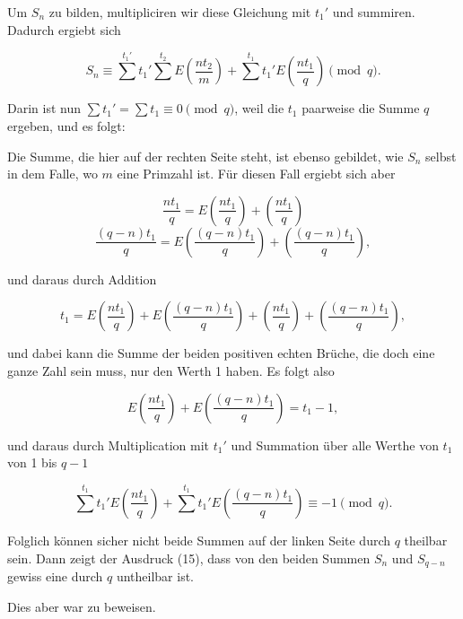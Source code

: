

Um $S_n$ zu bilden, multipliciren wir diese Gleichung mit $t_1'$ und
summiren. Dadurch ergiebt sich

\[
S_n \equiv \sum^{t_1'} t_1' \sum^{t_2} E\left(\frac{n t_2}{m}\right)
+ \sum^{t_1} t_1' E\left(\frac{n t_1}{q}\right) \pmod q.
\]

Darin ist nun $\sum t_1' = \sum t_1 \equiv 0 \pmod q$, weil die $t_1$
paarweise die Summe $q$ ergeben, und es folgt:


Die Summe, die hier auf der rechten Seite steht, ist ebenso gebildet,
wie $S_n$ selbst in dem Falle, wo $m$ eine Primzahl ist. F\"ur diesen
Fall ergiebt sich aber

\[
\frac{n t_1}{q} = E\left(\frac{n t_1}{q}\right) + \left(\frac{n t_1}{q}\right)
\]
\[
\frac{(q-n) t_1}{q} = E\left(\frac{(q-n) t_1}{q}\right) + \left(\frac{(q-n) t_1}{q}\right),
\]

und daraus durch Addition

\[
t_1 = E\left(\frac{n t_1}{q}\right) + E\left(\frac{(q-n) t_1}{q}\right)
+ \left(\frac{n t_1}{q}\right) + \left(\frac{(q-n) t_1}{q}\right),
\]

und dabei kann die Summe der beiden positiven echten Br\"uche, die
doch eine ganze Zahl sein muss, nur den Werth 1 haben. Es folgt also

\[
E\left(\frac{n t_1}{q}\right) + E\left(\frac{(q-n) t_1}{q}\right) = t_1 - 1,
\]

und daraus durch Multiplication mit $t_1'$ und Summation \"uber alle
Werthe von $t_1$ von 1 bis $q - 1$

\[
\sum^{t_1} t_1' E\left(\frac{n t_1}{q}\right)
+ \sum^{t_1} t_1' E\left(\frac{(q-n) t_1}{q}\right) \equiv -1 \pmod q.
\]

Folglich k\"onnen sicher nicht beide Summen auf der linken Seite durch
$q$ theilbar sein. Dann zeigt der Ausdruck (15), dass von den beiden
Summen $S_n$ und $S_{q-n}$ gewiss eine durch $q$ untheilbar ist.

Dies aber war zu beweisen.
